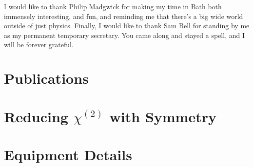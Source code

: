 \documentclass[11pt,a4paper,final]{report}
\begin{document}
I would like to thank Philip Madgwick for making my time in Bath both immensely interesting, and fun, and reminding me that there's a big wide world outside of just physics. Finally, I would like to thank Sam Bell for standing by me as my permanent temporary secretary. You came along and stayed a spell, and I will be forever grateful.

\chapter*{Publications}

\begin{sloppypar}

	\bigskip \noindent {}

	\bigskip \noindent {}


	\bigskip \noindent {}

	\bigskip \noindent {}

	\bigskip \noindent {}

	\bigskip \noindent {}

	\bigskip \noindent {}
\end{sloppypar}












%


\clearpage

\appendix
\chapter{Reducing \texorpdfstring{$\chi^{(2)}$}{Lg} with Symmetry}\label{sec:appendix:rotations}

\chapter{Equipment Details}\label{sec:appendix:Hardware}

\end{document}
